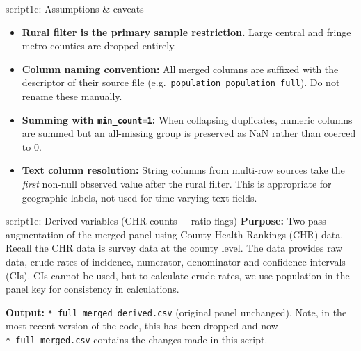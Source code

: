 \documentclass[aspectratio=169]{beamer}
\begin{document}
\begin{frame}{script1c: Assumptions \& caveats}
\begin{itemize}
    \item \textbf{Rural filter is the primary sample restriction.} Large central and fringe metro counties are dropped entirely.
    \item \textbf{Column naming convention:} All merged columns are suffixed with the descriptor of their source file (e.g.\ \texttt{population\_population\_full}). Do not rename these manually.
    \item \textbf{Summing with \texttt{min\_count=1}:} When collapsing duplicates, numeric columns are summed but an all-missing group is preserved as NaN rather than coerced to 0.
    \item \textbf{Text column resolution:} String columns from multi-row sources take the \textit{first} non-null observed value after the rural filter. This is appropriate for geographic labels, not used for time-varying text fields.
\end{itemize}
\end{frame}


\begin{frame}{script1e: Derived variables (CHR counts + ratio flags)}
\textbf{Purpose:} Two-pass augmentation of the merged panel using County Health Rankings (CHR) data. Recall the CHR data is survey data at the county level. The data provides raw data, crude rates of incidence, numerator, denominator and confidence intervals (CIs). CIs cannot be used, but to calculate crude rates, we use population in the panel key for consistency in calculations. 

\textbf{Output:} \texttt{*\_full\_merged\_derived.csv} (original panel unchanged). Note, in the most recent version of the code, this has been dropped and now \texttt{*\_full\_merged.csv} contains the changes made in this script. 
\end{frame}
\end{document}
